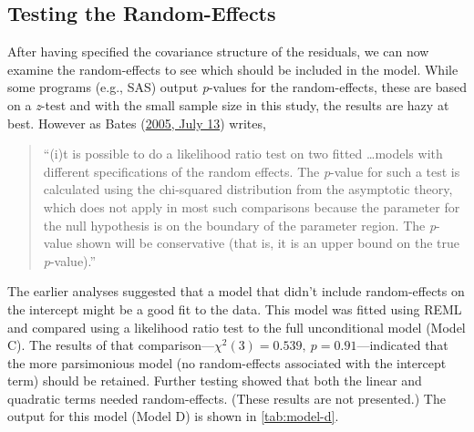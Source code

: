 \documentclass[11pt]{umnthesis}
\begin{document}
\hypertarget{testing-the-random-effects}{%
\subsection{Testing the Random-Effects}\label{testing-the-random-effects}}

After having specified the covariance structure of the residuals, we can now examine the random-effects to see which should be included in the model. While some programs (e.g., SAS) output \emph{p}-values for the random-effects, these are based on a \emph{z}-test and with the small sample size in this study, the results are hazy at best. However as Bates (\protect\hyperlink{ref-bates:2005a}{2005, July 13}) writes,

\begin{quote}
``(i)t is possible to do a likelihood ratio test on two fitted \ldots models with different specifications of the random effects. The \emph{p}-value for such a test is calculated using the chi-squared distribution from the asymptotic theory, which does not apply in most such comparisons because the parameter for the null hypothesis is on the boundary of the parameter region. The \emph{p}-value shown will be conservative (that is, it is an upper bound on the true \emph{p}-value).''
\end{quote}

The earlier analyses suggested that a model that didn't include random-effects on the intercept might be a good fit to the data. This model was fitted using REML and compared using a likelihood ratio test to the full unconditional model (Model C). The results of that comparison---\(\chi^2(3)=0.539,~p=0.91\)---indicated that the more parsimonious model (no random-effects associated with the intercept term) should be retained. Further testing showed that both the linear and quadratic terms needed random-effects. (These results are not presented.) The output for this model (Model D) is shown in \ref{tab:model-d}.
\end{document}
